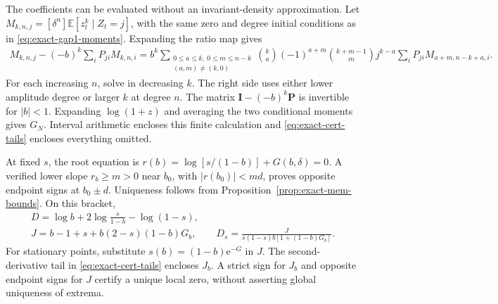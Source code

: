 The coefficients can be evaluated without an invariant-density approximation. Let
\(M_{k,n,j}=[\delta^n]\mathbb E[z_t^k\mid Z_t=j]\), with the same zero and degree initial conditions as in \eqref{eq:exact-gap1-moments}. Expanding the ratio map gives
\begin{equation}\label{eq:exact-cert-moments}
 \begin{split}
 M_{k,n,j}-(-b)^k\sum_iP_{ji}M_{k,n,i}
 =b^k\!\sum_{\substack{0\leq a\leq k,\ 0\leq m\leq n-k\\(a,m)\ne(k,0)}}
 {k\choose a}(-1)^{a+m}{k+m-1\choose m}
 j^{k-a}\sum_iP_{ji}M_{a+m,n-k+a,i}.
 \end{split}
\end{equation}
For each increasing \(n\), solve in decreasing \(k\). The right side uses either lower amplitude degree or larger \(k\) at degree \(n\). The matrix \(\mathbf I-(-b)^k\mathbf P\) is invertible for \(|b|<1\). Expanding \(\log(1+z)\) and averaging the two conditional moments gives \(G_N\). Interval arithmetic encloses this finite calculation and \eqref{eq:exact-cert-tails} encloses everything omitted.

At fixed \(s\), the root equation is \(r(b)=\log[s/(1-b)]+G(b,\delta)=0\). A verified lower slope \(r_b\geq m>0\) near \(b_0\), with \(|r(b_0)|<m d\), proves opposite endpoint signs at \(b_0\pm d\). Uniqueness follows from Proposition~\ref{prop:exact-mem-bounds}. On this bracket,
\begin{equation}\label{eq:exact-cert-derivative}
 \begin{gathered}
 D=\log b+2\log\frac{s}{1-b}-\log(1-s),\\
 J=b-1+s+b(2-s)(1-b)G_b,\qquad
 D_s=\frac{J}{s(1-s)b[1+(1-b)G_b]}.
 \end{gathered}
\end{equation}
For stationary points, substitute \(s(b)=(1-b)\mathrm e^{-G}\) in \(J\). The second-derivative tail in \eqref{eq:exact-cert-tails} encloses \(J_b\). A strict sign for \(J_b\) and opposite endpoint signs for \(J\) certify a unique local zero, without asserting global uniqueness of extrema.

